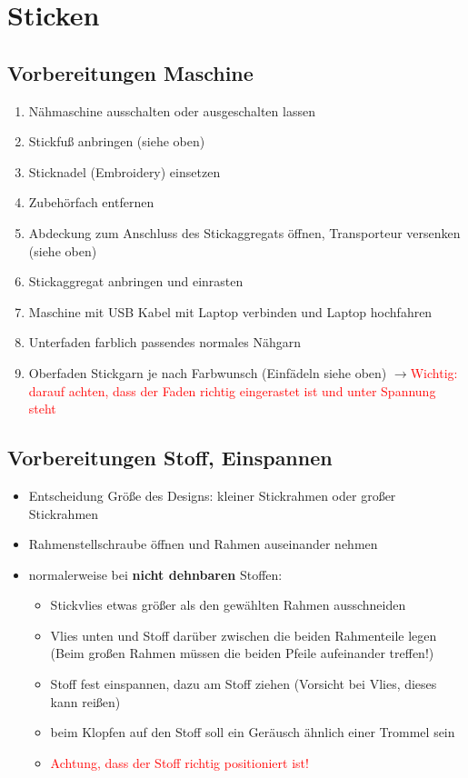 \documentclass{\basedir/fablab-document}
\newcommand{\pfeil}{\ensuremath{\rightarrow}}
\begin{document}
\pagebreak
\section{Sticken}

\subsection{Vorbereitungen Maschine}
\begin{enumerate}
	\item Nähmaschine ausschalten oder ausgeschalten lassen
	\item Stickfuß anbringen (siehe oben)
	\item Sticknadel (Embroidery) einsetzen
	\item Zubehörfach entfernen
	\item Abdeckung zum Anschluss des Stickaggregats öffnen, Transporteur versenken (siehe oben)
	\item Stickaggregat anbringen und einrasten
	\item Maschine mit USB Kabel mit Laptop verbinden und Laptop hochfahren
	\item Unterfaden farblich passendes normales Nähgarn
	\item Oberfaden Stickgarn je nach Farbwunsch (Einfädeln siehe oben) \pfeil \textcolor{red}{Wichtig: darauf achten, dass der Faden richtig eingerastet ist und unter Spannung steht}
\end{enumerate}

\subsection{Vorbereitungen Stoff, Einspannen}
\begin{itemize}
	\item Entscheidung Größe des Designs: kleiner Stickrahmen oder großer Stickrahmen
	\item Rahmenstellschraube öffnen und Rahmen auseinander nehmen
	\item normalerweise bei \textbf{nicht dehnbaren} Stoffen:
	\begin{itemize}
		\item Stickvlies etwas größer als den gewählten Rahmen ausschneiden
		\item Vlies unten und Stoff darüber zwischen die beiden Rahmenteile legen (Beim großen Rahmen müssen die beiden Pfeile aufeinander treffen!)
		\item Stoff fest einspannen, dazu am Stoff ziehen (Vorsicht bei Vlies, dieses kann reißen)
		\item beim Klopfen auf den Stoff soll ein Geräusch ähnlich einer Trommel sein
		\item \textcolor{red}{Achtung, dass der Stoff richtig positioniert ist!} 
	\end{itemize}
\end{itemize} 
\end{document}
